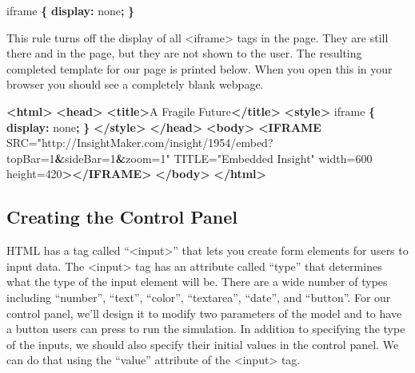 \documentclass[]{memoir}
\newenvironment{Shaded}{}{}
\newcommand{\KeywordTok}[1]{\textcolor[rgb]{0.00,0.44,0.13}{\textbf{{#1}}}}
\newcommand{\DataTypeTok}[1]{\textcolor[rgb]{0.56,0.13,0.00}{{#1}}}
\newcommand{\StringTok}[1]{\textcolor[rgb]{0.25,0.44,0.63}{{#1}}}
\newcommand{\OtherTok}[1]{\textcolor[rgb]{0.00,0.44,0.13}{{#1}}}
\newcommand{\ErrorTok}[1]{\textcolor[rgb]{1.00,0.00,0.00}{\textbf{{#1}}}}
\newcommand{\NormalTok}[1]{{#1}}
\begin{document}
\begin{Shaded}
\begin{Highlighting}[]
\NormalTok{iframe }\KeywordTok{\{}
    \KeywordTok{display:} \DataTypeTok{none}\KeywordTok{;}
\KeywordTok{\}}
\end{Highlighting}
\end{Shaded}

This rule turns off the display of all \textless{}iframe\textgreater{}
tags in the page. They are still there and in the page, but they are not
shown to the user. The resulting completed template for our page is
printed below. When you open this in your browser you should see a
completely blank webpage.

\begin{Shaded}
\begin{Highlighting}[]
\KeywordTok{<html>}
\KeywordTok{<head>}
    \KeywordTok{<title>}\NormalTok{A Fragile Future}\KeywordTok{</title>}
    \KeywordTok{<style>}
        \NormalTok{iframe }\KeywordTok{\{}
            \KeywordTok{display:} \DataTypeTok{none}\KeywordTok{;}
        \KeywordTok{\}}
    \KeywordTok{</style>}
\KeywordTok{</head>}
\KeywordTok{<body>}
    \KeywordTok{<IFRAME}\OtherTok{ SRC=}\StringTok{"http://InsightMaker.com/insight/1954/embed?topBar=1}\ErrorTok{&}\StringTok{sideBar=1}\ErrorTok{&}\StringTok{zoom=1"}
\OtherTok{    TITLE=}\StringTok{"Embedded Insight"}\OtherTok{ width=}\StringTok{600}\OtherTok{ height=}\StringTok{420}\KeywordTok{></IFRAME>}  
\KeywordTok{</body>}
\KeywordTok{</html>}
\end{Highlighting}
\end{Shaded}

\subsection{Creating the Control Panel}

HTML has a tag called ``\textless{}input\textgreater{}'' that lets you
create form elements for users to input data. The
\textless{}input\textgreater{} tag has an attribute called ``type'' that
determines what the type of the input element will be. There are a wide
number of types including ``number'', ``text'', ``color'', ``textarea'',
``date'', and ``button''. For our control panel, we'll design it to
modify two parameters of the model and to have a button users can press
to run the simulation. In addition to specifying the type of the inputs,
we should also specify their initial values in the control panel. We can
do that using the ``value'' attribute of the
\textless{}input\textgreater{} tag.
\end{document}
